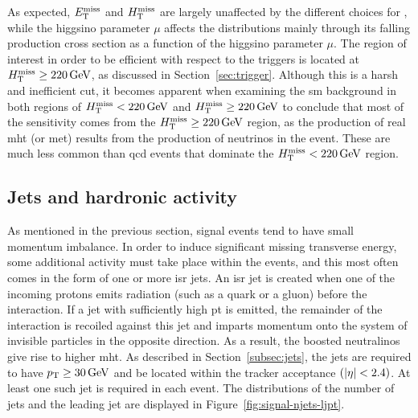As expected, $E_{\mathrm{T}}^{\text{miss}}$ and $H_{\mathrm{T}}^{\text{miss}}$ are largely unaffected by the different choices for \dm, while the higgsino parameter $\mu$ affects the distributions mainly through its falling production cross section as a function of the higgsino parameter $\mu$. The region of interest in order to be efficient with respect to the triggers is located at $H_{\mathrm{T}}^{\text{miss}}\geq 220\,\text{Ge\hspace{-.08em}V}$, as discussed in Section~\ref{sec:trigger}. Although this is a harsh and inefficient cut, it becomes apparent when examining the \gls{sm} background in both regions of $H_{\mathrm{T}}^{\text{miss}} < 220\,\text{Ge\hspace{-.08em}V}$ and $H_{\mathrm{T}}^{\text{miss}}\geq 220\,\text{Ge\hspace{-.08em}V}$ to conclude that most of the sensitivity comes from the $H_{\mathrm{T}}^{\text{miss}}\geq 220\,\text{Ge\hspace{-.08em}V}$ region, as the production of real \gls{mht} (or \gls{met}) results from the production of neutrinos in the event. These are much less common than \gls{qcd} events that dominate the $H_{\mathrm{T}}^{\text{miss}} < 220\,\text{Ge\hspace{-.08em}V}$ region.

\subsection{Jets and hardronic activity}

As mentioned in the previous section, signal events tend to have small momentum imbalance. In order to induce significant missing transverse energy, some additional activity must take place within the events, and this most often comes in the form of one or more \gls{isr} jets. An \gls{isr} jet is created when one of the incoming protons emits radiation (such as a quark or a gluon) before the interaction. If a jet with sufficiently high \gls{pt} is emitted, the remainder of the interaction is recoiled against this jet and imparts momentum onto the system of invisible particles in the opposite direction. As a result, the boosted \glspl{neutralino} \neuto give rise to higher \gls{mht}. As described in Section~\ref{subsec:jets}, the jets are required to have $p_{\mathrm{T}} \geq 30\,\text{Ge\hspace{-.08em}V}$ and be located within the tracker acceptance $\left(\abs{\eta}<2.4\right)$. At least one such jet is required in each event. The distributions of the number of jets and the leading jet \pt are displayed in Figure~\ref{fig:signal-njets-ljpt}.

